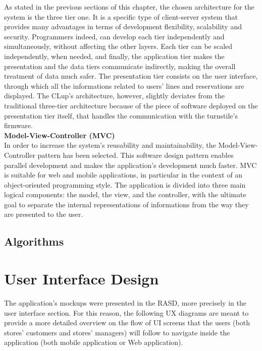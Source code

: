\documentclass{article}
\begin{document}
\noindent As stated in the previous sections of this chapter, the chosen architecture for the system is the three tier one. It is a specific type of client-server system that provides many advantages in terms of development flexibility, scalability and security. Programmers indeed, can develop each tier independently and simultaneously, without affecting the other layers. Each tier can be scaled independently, when needed, and finally, the application tier makes the presentation and the data tiers communicate indirectly, making the overall treatment of data much safer. The presentation tier consists on the user interface, through which all the informations related to users’ lines and reservations are displayed. The CLup’s architecture, however, slightly deviates from the traditional three-tier architecture because of the piece of software deployed on the presentation tier itself, that handles the communication with the turnstile’s firmware.\\

\textbf{Model-View-Controller (MVC)}\\

\noindent In order to increase the system’s reusability and maintainability, the Model-View-Controller pattern has been selected. This software design pattern enables parallel development and makes the application’s development much faster. MVC is suitable for web and mobile applications, in particular in the context of an object-oriented programming style. The application is divided into three main logical components: the model, the view, and the controller, with the ultimate goal to separate the internal representations of informations from the way they are presented to the user.


\subsection{Algorithms}

\section{User Interface Design}
The application's mockups were presented in the RASD, more precisely in the user interface section. For this reason, the following UX diagrams are meant to provide a more detailed overview on the flow of UI screens that the users (both stores' customers and stores' managers) will follow to navigate inside the application (both mobile application or Web application).
\end{document}

